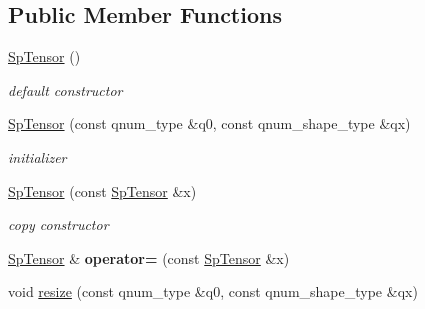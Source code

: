 \subsection*{Public Member Functions}
\begin{DoxyCompactItemize}
\item 
\hypertarget{classbtas_1_1_sp_tensor_ab8b43cfc70211fab1d560a353dcf0fcc}{
\hyperlink{classbtas_1_1_sp_tensor_ab8b43cfc70211fab1d560a353dcf0fcc}{SpTensor} ()}
\label{classbtas_1_1_sp_tensor_ab8b43cfc70211fab1d560a353dcf0fcc}

\begin{DoxyCompactList}\small\item\em default constructor \item\end{DoxyCompactList}\item 
\hypertarget{classbtas_1_1_sp_tensor_a71e7c7e3cc00f3f214e1e4b83a22ef17}{
\hyperlink{classbtas_1_1_sp_tensor_a71e7c7e3cc00f3f214e1e4b83a22ef17}{SpTensor} (const qnum\_\-type \&q0, const qnum\_\-shape\_\-type \&qx)}
\label{classbtas_1_1_sp_tensor_a71e7c7e3cc00f3f214e1e4b83a22ef17}

\begin{DoxyCompactList}\small\item\em initializer \item\end{DoxyCompactList}\item 
\hypertarget{classbtas_1_1_sp_tensor_aa2139773c737d8b915b4311ac582600e}{
\hyperlink{classbtas_1_1_sp_tensor_aa2139773c737d8b915b4311ac582600e}{SpTensor} (const \hyperlink{classbtas_1_1_sp_tensor}{SpTensor} \&x)}
\label{classbtas_1_1_sp_tensor_aa2139773c737d8b915b4311ac582600e}

\begin{DoxyCompactList}\small\item\em copy constructor \item\end{DoxyCompactList}\item 
\hypertarget{classbtas_1_1_sp_tensor_aba11edb81dc7eefb9b4426b65aecd2f5}{
\hyperlink{classbtas_1_1_sp_tensor}{SpTensor} \& {\bfseries operator=} (const \hyperlink{classbtas_1_1_sp_tensor}{SpTensor} \&x)}
\label{classbtas_1_1_sp_tensor_aba11edb81dc7eefb9b4426b65aecd2f5}

\item 
\hypertarget{classbtas_1_1_sp_tensor_aa384f36c6ae16c4d0ae6321892442647}{
void \hyperlink{classbtas_1_1_sp_tensor_aa384f36c6ae16c4d0ae6321892442647}{resize} (const qnum\_\-type \&q0, const qnum\_\-shape\_\-type \&qx)}
\label{classbtas_1_1_sp_tensor_aa384f36c6ae16c4d0ae6321892442647}


\end{DoxyCompactItemize}
